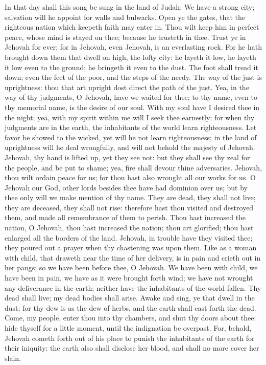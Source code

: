 In that day shall this song be sung in the land of Judah: We have a strong city; salvation will he appoint for walls and bulwarks. Open ye the gates, that the righteous nation which keepeth faith may enter in. Thou wilt keep him in perfect peace, whose mind is stayed on thee; because he trusteth in thee. Trust ye in Jehovah for ever; for in Jehovah, even Jehovah, is an everlasting rock. For he hath brought down them that dwell on high, the lofty city: he layeth it low, he layeth it low even to the ground; he bringeth it even to the dust. The foot shall tread it down; even the feet of the poor, and the steps of the needy. The way of the just is uprightness: thou that art upright dost direct the path of the just.  Yea, in the way of thy judgments, O Jehovah, have we waited for thee; to thy name, even to thy memorial name, is the desire of our soul. With my soul have I desired thee in the night; yea, with my spirit within me will I seek thee earnestly: for when thy judgments are in the earth, the inhabitants of the world learn righteousness. Let favor be showed to the wicked, yet will he not learn righteousness; in the land of uprightness will he deal wrongfully, and will not behold the majesty of Jehovah.  Jehovah, thy hand is lifted up, yet they see not: but they shall see thy zeal for the people, and be put to shame; yea, fire shall devour thine adversaries. Jehovah, thou wilt ordain peace for us; for thou hast also wrought all our works for us. O Jehovah our God, other lords besides thee have had dominion over us; but by thee only will we make mention of thy name. They are dead, they shall not live; they are deceased, they shall not rise: therefore hast thou visited and destroyed them, and made all remembrance of them to perish. Thou hast increased the nation, O Jehovah, thou hast increased the nation; thou art glorified; thou hast enlarged all the borders of the land.  Jehovah, in trouble have they visited thee; they poured out a prayer when thy chastening was upon them. Like as a woman with child, that draweth near the time of her delivery, is in pain and crieth out in her pangs; so we have been before thee, O Jehovah. We have been with child, we have been in pain, we have as it were brought forth wind; we have not wrought any deliverance in the earth; neither have the inhabitants of the world fallen. Thy dead shall live; my dead bodies shall arise. Awake and sing, ye that dwell in the dust; for thy dew is as the dew of herbs, and the earth shall cast forth the dead.  Come, my people, enter thou into thy chambers, and shut thy doors about thee: hide thyself for a little moment, until the indignation be overpast. For, behold, Jehovah cometh forth out of his place to punish the inhabitants of the earth for their iniquity: the earth also shall disclose her blood, and shall no more cover her slain. 

